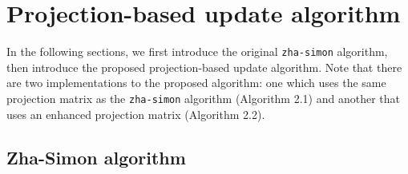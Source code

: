 \section{Projection-based update algorithm}
\label{sec:alg}

In the following sections, we first introduce the original \verb|zha-simon| algorithm, then introduce the proposed projection-based update algorithm.
Note that there are two implementations to the proposed algorithm: one which uses the same projection matrix as the \verb|zha-simon| algorithm (Algorithm 2.1) and another that uses an enhanced projection matrix (Algorithm 2.2).

\subsection{Zha-Simon algorithm}
\label{alg:zha-simon}

